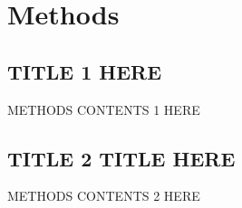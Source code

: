 
\section{Methods}

\subsection{TITLE 1 HERE}
METHODS CONTENTS 1 HERE

\subsection{TITLE 2 TITLE HERE}
METHODS CONTENTS 2 HERE

\label{sec:methods}

